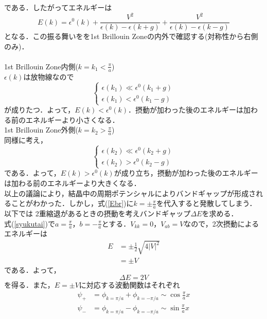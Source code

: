 \documentclass{standalone}
\begin{document}
  である．したがってエネルギーは
  \begin{equation}
    \label{Ebr}
    E(k)=\epsilon^0(k)+\frac{V^2}{\epsilon(k)-\epsilon(k+g)}+\frac{V^2}{\epsilon(k)-\epsilon(k-g)}
  \end{equation}
  となる．この振る舞いをを1st Brillouin Zoneの内外で確認する(対称性から右側のみ)．\\
  \\
  1st Brillouin Zone内側($k=k_1<\frac{\pi}{a}$)\\
  $\epsilon(k)$は放物線なので
  \begin{equation}
    \begin{cases}
      \epsilon(k_1)\ll\epsilon^0(k_1+g)\\
      \epsilon(k_1)<\epsilon^0(k_1-g)
    \end{cases}
  \end{equation}
  が成りたつ．よって，$E(k)<\epsilon^0(k)$．摂動が加わった後のエネルギーは加わる前のエネルギーより小さくなる．\\
  1st Brillouin Zone外側($k=k_2>\frac{\pi}{a}$)\\
  同様に考え，
  \begin{equation}
    \begin{cases}
      \epsilon(k_2)\ll\epsilon^0(k_2+g)\\
      \epsilon(k_2)>\epsilon^0(k_2-g)
    \end{cases}
  \end{equation}
  である．よって，$E(k)>\epsilon^0(k)$が成り立ち，摂動が加わった後のエネルギーは加わる前のエネルギーより大きくなる．\\
  以上の議論により，結晶中の周期ポテンシャルによりバンドギャップが形成されることがわかった．しかし，式(\ref{Ebr})に$k=\pm\frac{\pi}{a}$を代入すると発散してしまう．以下では
  2重縮退があるときの摂動を考えバンドギャップ$\Delta E$を求める．\\
  式(\ref{syukutai})で$a=\frac{\pi}{a}$，$b=-\frac{\pi}{a}$とする．$V_{kk}=0，V_{ab}=V$なので，2次摂動によるエネルギーは
  \begin{align}
    E&=\pm\frac{1}{2}\sqrt{4|V|^2}\\
    &=\pm V
  \end{align}
  である．よって，
  \begin{equation}
    \Delta E=2V
  \end{equation}
  を得る．また，$E=\pm V$に対応する波動関数はそれぞれ
  \begin{align}
    \psi_{+}&=\phi_{k=\pi/a}+\phi_{k=-\pi/a}\sim\cos\frac{\pi}{a}x\\
    \psi_{-}&=\phi_{k=\pi/a}-\phi_{k=-\pi/a}\sim\sin\frac{\pi}{a}x
  \end{align}
\end{document}
